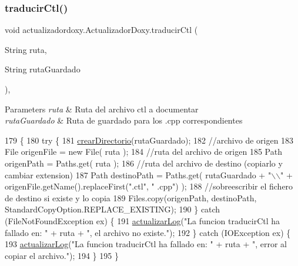 \subsubsection{\texorpdfstring{traducir\+Ctl()}{traducirCtl()}}
{\footnotesize\ttfamily void actualizadordoxy.\+Actualizador\+Doxy.\+traducir\+Ctl (\begin{DoxyParamCaption}\item[{String}]{ruta,  }\item[{String}]{ruta\+Guardado }\end{DoxyParamCaption})\hspace{0.3cm}{\ttfamily [inline]}, {\ttfamily [private]}}


\begin{DoxyParams}{Parameters}
{\em ruta} & Ruta del archivo ctl a documentar \\
\hline
{\em ruta\+Guardado} & Ruta de guardado para los .cpp correspondientes \\
\hline
\end{DoxyParams}

\begin{DoxyCode}
179                                                               \{
180         \textcolor{keywordflow}{try} \{
181             \mbox{\hyperlink{classactualizadordoxy_1_1_actualizador_doxy_a7d8af20d53904ac818f04740c5264d9f}{crearDirectorio}}(rutaGuardado);
182             \textcolor{comment}{//archivo de origen}
183             File origenFile = \textcolor{keyword}{new} File( ruta );
184             \textcolor{comment}{//ruta del archivo de origen}
185             Path origenPath = Paths.get( ruta );
186             \textcolor{comment}{//ruta del archivo de destino (copiarlo y cambiar extension)}
187             Path destinoPath = Paths.get( rutaGuardado + \textcolor{stringliteral}{"\(\backslash\)\(\backslash\)"} + origenFile.getName().replaceFirst(\textcolor{stringliteral}{".ctl"}, \textcolor{stringliteral}{"
      .cpp"}) );
188             \textcolor{comment}{//sobreescribir el fichero de destino si existe y lo copia}
189             Files.copy(origenPath, destinoPath, StandardCopyOption.REPLACE\_EXISTING);
190         \} \textcolor{keywordflow}{catch} (FileNotFoundException ex) \{
191             \mbox{\hyperlink{classactualizadordoxy_1_1_actualizador_doxy_a1ad41046efbaaf40a60b34da347f9090}{actualizarLog}}(\textcolor{stringliteral}{"La funcion traducirCtl ha fallado en: "} + ruta + \textcolor{stringliteral}{", el archivo no
       existe."});
192         \} \textcolor{keywordflow}{catch} (IOException ex) \{
193             \mbox{\hyperlink{classactualizadordoxy_1_1_actualizador_doxy_a1ad41046efbaaf40a60b34da347f9090}{actualizarLog}}(\textcolor{stringliteral}{"La funcion traducirCtl ha fallado en: "} + ruta + \textcolor{stringliteral}{", error al copiar
       el archivo."});
194         \}
195     \}
\end{DoxyCode}
\mbox{\label{classactualizadordoxy_1_1_actualizador_doxy_a598c7f1543ae3cf3f24b3fabcf2ad204}} 
